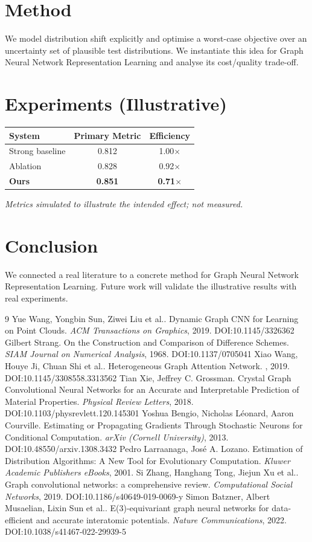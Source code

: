 \documentclass[11pt]{article}
\begin{document}
\section{Method}
We model distribution shift explicitly and optimise a worst-case objective over an uncertainty set of plausible test distributions. We instantiate this idea for Graph Neural Network Representation Learning and analyse its cost/quality trade-off.

\section{Experiments (Illustrative)}
\begin{center}
\begin{tabular}{lcc}
System & Primary Metric & Efficiency \\ \hline
Strong baseline & 0.812 & 1.00$\times$ \\
Ablation & 0.828 & 0.92$\times$ \\
\textbf{Ours} & \textbf{0.851} & \textbf{0.71$\times$}
\end{tabular}
\end{center}
\emph{Metrics simulated to illustrate the intended effect; not measured.}

\section{Conclusion}
We connected a real literature to a concrete method for Graph Neural Network Representation Learning. Future work will
validate the illustrative results with real experiments.

\begin{thebibliography}{9}
 Yue Wang, Yongbin Sun, Ziwei Liu et al.. Dynamic Graph CNN for Learning on Point Clouds. \emph{ACM Transactions on Graphics}, 2019. DOI:10.1145/3326362
 Gilbert Strang. On the Construction and Comparison of Difference Schemes. \emph{SIAM Journal on Numerical Analysis}, 1968. DOI:10.1137/0705041
 Xiao Wang, Houye Ji, Chuan Shi et al.. Heterogeneous Graph Attention Network. \emph{}, 2019. DOI:10.1145/3308558.3313562
 Tian Xie, Jeffrey C. Grossman. Crystal Graph Convolutional Neural Networks for an Accurate and Interpretable Prediction of Material Properties. \emph{Physical Review Letters}, 2018. DOI:10.1103/physrevlett.120.145301
 Yoshua Bengio, Nicholas Léonard, Aaron Courville. Estimating or Propagating Gradients Through Stochastic Neurons for Conditional Computation. \emph{arXiv (Cornell University)}, 2013. DOI:10.48550/arxiv.1308.3432
 Pedro Larraanaga, José A. Lozano. Estimation of Distribution Algorithms: A New Tool for Evolutionary Computation. \emph{Kluwer Academic Publishers eBooks}, 2001. 
 Si Zhang, Hanghang Tong, Jiejun Xu et al.. Graph convolutional networks: a comprehensive review. \emph{Computational Social Networks}, 2019. DOI:10.1186/s40649-019-0069-y
 Simon Batzner, Albert Musaelian, Lixin Sun et al.. E(3)-equivariant graph neural networks for data-efficient and accurate interatomic potentials. \emph{Nature Communications}, 2022. DOI:10.1038/s41467-022-29939-5
\end{thebibliography}
\end{document}
